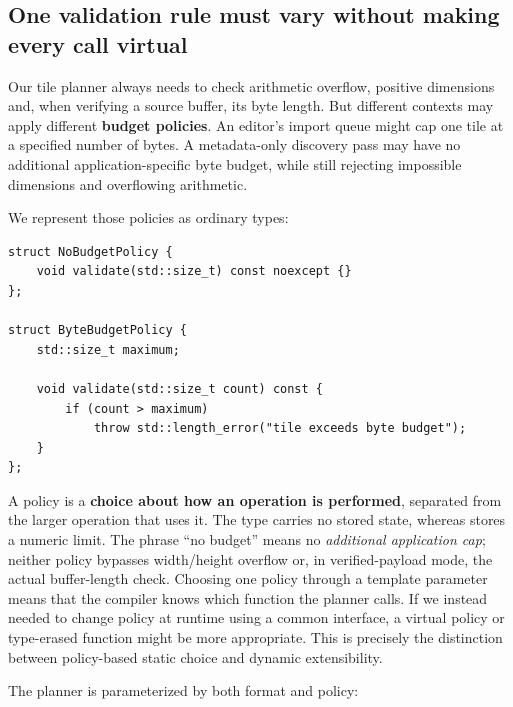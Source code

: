 \subsection{One validation rule must vary without making every call virtual}\label{01-foundations-i-ch005-one-validation-rule-must-vary-without-making-every-call-virtual}

\hypertarget{01-foundations-i-ch005-one-validation-rule-must-vary-without-making-every-call-virtual}{}

Our tile planner always needs to check arithmetic overflow, positive dimensions and, when verifying a source buffer, its byte length. But different contexts may apply different \textbf{budget policies}. An editor's import queue might cap one tile at a specified number of bytes. A metadata-only discovery pass may have no additional application-specific byte budget, while still rejecting impossible dimensions and overflowing arithmetic.

We represent those policies as ordinary types:

\begin{verbatim}
struct NoBudgetPolicy {
    void validate(std::size_t) const noexcept {}
};

struct ByteBudgetPolicy {
    std::size_t maximum;

    void validate(std::size_t count) const {
        if (count > maximum)
            throw std::length_error("tile exceeds byte budget");
    }
};
\end{verbatim}

A policy is a \textbf{choice about how an operation is performed}, separated from the larger operation that uses it. The type  carries no stored state, whereas  stores a numeric limit. The phrase ``no budget'' means no \emph{additional application cap}; neither policy bypasses width/height overflow or, in verified-payload mode, the actual buffer-length check. Choosing one policy through a template parameter means that the compiler knows which  function the planner calls. If we instead needed to change policy at runtime using a common interface, a virtual policy or type-erased function might be more appropriate. This is precisely the distinction between policy-based static choice and dynamic extensibility.

The planner is parameterized by both format and policy:

